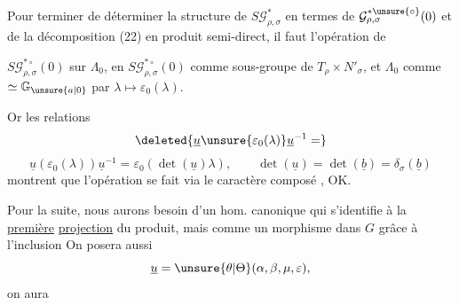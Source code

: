 Pour terminer de déterminer la structure
de $S\mathcal{G}_{\rho,\sigma}^{*}$ en termes de $\mathcal{G}_{\rho,\sigma}^{*\unsure{\circ}}(0)$ et
de la décomposition (22) en produit semi-direct, il faut  l'opération de


$S\mathcal{G}_{\rho,\sigma}^{*\circ}(0)$ sur $\Lambda_0$, en 
$S\mathcal{G}_{\rho,\sigma}^{*\circ}(0)$ comme sous-groupe de $T_\rho\times N'_\sigma$,
et $\Lambda_0$ comme  $\simeq \mathbb{G}_{\unsure{a|0}}$ par $\lambda\mapsto\varepsilon_0(\lambda)$.

Or les relations
\[
\deleted{\underline{u}\unsure{\varepsilon_0(\lambda)}\underline{u}^{-1}=}
\]
\[
\underline{u}(\varepsilon_0(\lambda))\underline{u}^{-1}
 =\varepsilon_0(\det(\underline{u})\lambda),\qquad
\det(\underline{u})=\det(\underline{b})=\delta_\sigma(\underline{b})
\]
montrent que l'opération se fait via
le caractère composé
, OK.

Pour la suite, nous aurons besoin
d'un hom. canonique
qui s'identifie à la \uline{première} \uline{projection}
du produit, mais  comme
un morphisme dans $G$ grâce à l'inclusion
On posera aussi 
\unsure{(}
\[
\underline{u}=\unsure{\theta|\Theta}(\alpha,\beta,\mu,\varepsilon),
\]
  on aura

